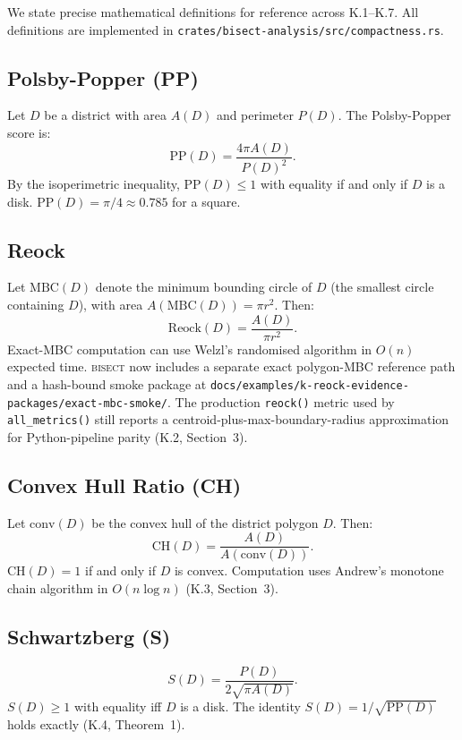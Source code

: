 We state precise mathematical definitions for reference across K.1--K.7.
All definitions are implemented in
\texttt{crates/bisect-analysis/src/compactness.rs}.

\subsection{Polsby-Popper (PP)}

Let $D$ be a district with area $A(D)$ and perimeter $P(D)$. The
Polsby-Popper score is:
\[
  \text{PP}(D) = \frac{4\pi A(D)}{P(D)^2}.
\]
By the isoperimetric inequality, PP$(D) \leq 1$ with equality if and only if $D$
is a disk. PP$(D) = \pi/4 \approx 0.785$ for a square.

\subsection{Reock}

Let $\text{MBC}(D)$ denote the minimum bounding circle of $D$ (the smallest
circle containing $D$), with area $A(\text{MBC}(D)) = \pi r^2$. Then:
\[
  \text{Reock}(D) = \frac{A(D)}{\pi r^2}.
\]
Exact-MBC computation can use Welzl's randomised algorithm in $O(n)$ expected
time.  \textsc{bisect} now includes a separate exact polygon-MBC reference path
and a hash-bound smoke package at
\texttt{docs/examples/k-reock-evidence-packages/exact-mbc-smoke/}.  The
production \texttt{reock()} metric used by \texttt{all\_metrics()} still reports
a centroid-plus-max-boundary-radius approximation for Python-pipeline parity
(K.2, Section~3).

\subsection{Convex Hull Ratio (CH)}

Let $\text{conv}(D)$ be the convex hull of the district polygon $D$. Then:
\[
  \text{CH}(D) = \frac{A(D)}{A(\text{conv}(D))}.
\]
CH$(D) = 1$ if and only if $D$ is convex. Computation uses Andrew's monotone
chain algorithm in $O(n \log n)$ (K.3, Section~3).

\subsection{Schwartzberg (S)}

\[
  S(D) = \frac{P(D)}{2\sqrt{\pi A(D)}}.
\]
$S(D) \geq 1$ with equality iff $D$ is a disk. The identity $S(D) = 1/\sqrt{\text{PP}(D)}$
holds exactly (K.4, Theorem~1).

